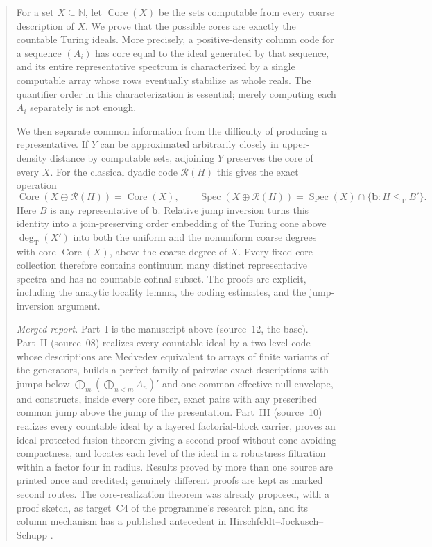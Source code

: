 \documentclass[11pt,letterpaper]{article}
\theoremstyle{plain}
\theoremstyle{definition}
\theoremstyle{remark}
\numberwithin{equation}{section}
\newcommand{\N}{\mathbb N}
\newcommand{\leT}{\leq_{\mathrm T}}
\newcommand{\Core}{\operatorname{Core}}
\newcommand{\Spec}{\operatorname{Spec}}
\newcommand{\degT}{\deg_{\mathrm T}}
\newcommand{\Rcode}{\mathcal R}
\begin{document}
\begin{abstract}
For a set $X\subseteq\N$, let $\Core(X)$ be the sets computable from every
coarse description of $X$. We prove that the possible cores are exactly the
countable Turing ideals. More precisely, a positive-density column code for a
sequence $(A_i)$ has core equal to the ideal generated by that sequence, and its
entire representative spectrum is characterized by a single computable array
whose rows eventually stabilize as whole reals. The quantifier order in this
characterization is essential; merely computing each $A_i$ separately is not
enough.

We then separate common information from the difficulty of producing a
representative. If $Y$ can be approximated arbitrarily closely in upper-density
distance by computable sets, adjoining $Y$ preserves the core of every $X$.
For the classical dyadic code $\Rcode(H)$ this gives the exact operation
\[
 \Core(X\oplus\Rcode(H))=\Core(X),\qquad
 \Spec(X\oplus\Rcode(H))=\Spec(X)\cap\{\mathbf b:H\leT B'\}.
\]
Here $B$ is any representative of $\mathbf b$. Relative jump inversion turns
this identity into a join-preserving order embedding of the Turing cone above
$\degT(X')$ into both the uniform and the nonuniform coarse degrees with core
$\Core(X)$, above the coarse degree of $X$. Every fixed-core collection therefore
contains continuum many distinct representative spectra and has no countable
cofinal subset. The proofs are explicit, including the analytic locality lemma,
the coding estimates, and the jump-inversion argument.

\emph{Merged report.} Part~I is the manuscript above (source~12, the base).
Part~II (source~08) realizes every countable ideal by a two-level code whose
descriptions are Medvedev equivalent to arrays of finite variants of the
generators, builds a perfect family of pairwise exact descriptions with jumps
below $\bigoplus_m(\bigoplus_{n<m}A_n)'$ and one common effective null envelope,
and constructs, inside every core fiber, exact pairs with any prescribed common
jump above the jump of the presentation. Part~III (source~10) realizes every
countable ideal by a layered factorial-block carrier, proves an
ideal-protected fusion theorem giving a second proof without cone-avoiding
compactness, and locates each level of the ideal in a robustness filtration
within a factor four in radius. Results proved by more than one source are
printed once and credited; genuinely different proofs are kept as marked
second routes. The core-realization theorem was already proposed, with a proof
sketch, as target~C4 of the programme's research plan, and its column mechanism
has a published antecedent in Hirschfeldt--Jockusch--Schupp \cite{HJS}.
\end{abstract}
\end{document}
